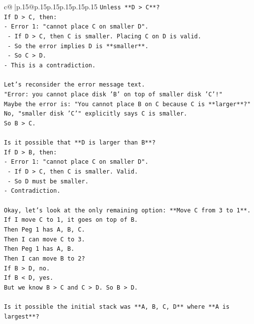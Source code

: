 \documentclass{article}
\begin{document}
{\begin{supertabular}{c@{$\;$}|p{.15\linewidth}@{}p{.15\linewidth}p{.15\linewidth}p{.15\linewidth}p{.15\linewidth}p{.15\linewidth}}
{{{\texttt{Unless **D > C**?} \\
\texttt{If D > C, then:} \\
\texttt{{-} Error 1: "cannot place C on smaller D".} \\
\texttt{    {-} If D > C, then C is smaller. Placing C on D is valid.} \\
\texttt{    {-} So the error implies D is **smaller**.} \\
\texttt{    {-} So C > D.} \\
\texttt{{-} This is a contradiction.} \\
\\ 
\texttt{Let's reconsider the error message text.} \\
\texttt{"Error: you cannot place disk 'B' on top of smaller disk 'C'!"} \\
\texttt{Maybe the error is: "You cannot place B on C because C is **larger**?"} \\
\texttt{No, "smaller disk 'C'" explicitly says C is smaller.} \\
\texttt{So B > C.} \\
\\ 
\texttt{Is it possible that **D is larger than B**?} \\
\texttt{If D > B, then:} \\
\texttt{{-} Error 1: "cannot place C on smaller D".} \\
\texttt{    {-} If D > C, then C is smaller. Valid.} \\
\texttt{    {-} So D must be smaller.} \\
\texttt{{-} Contradiction.} \\
\\ 
\texttt{Okay, let's look at the only remaining option: **Move C from 3 to 1**.} \\
\texttt{If I move C to 1, it goes on top of B.} \\
\texttt{Then Peg 1 has A, B, C.} \\
\texttt{Then I can move C to 3.} \\
\texttt{Then Peg 1 has A, B.} \\
\texttt{Then I can move B to 2?} \\
\texttt{If B > D, no.} \\
\texttt{If B < D, yes.} \\
\texttt{But we know B > C and C > D. So B > D.} \\
\\ 
\texttt{Is it possible the initial stack was **A, B, C, D** where **A is largest**?} \\
}}}
\end{supertabular}}
\end{document}
